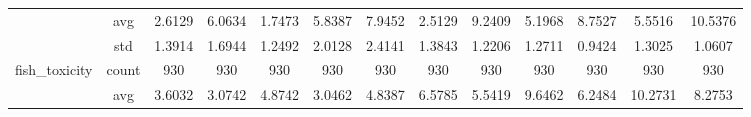 \begin{table}[htbp]
{\begin{tabular}{rcccccccccccc}
                                                     & avg                                    & 2.6129                                                                             & 6.0634                                                                    & \cellcolor[rgb]{ .776,  .937,  .808}\textcolor[rgb]{ 0,  .38,  0}{1.7473} & 5.8387                                                                    & 7.9452                                        & 2.5129                                      & 9.2409                                         & 5.1968                                         & 8.7527                                         & 5.5516                                         & 10.5376                                        \\
                                                     & std                                    & 1.3914                                                                             & 1.6944                                                                    & 1.2492                                                                    & 2.0128                                                                    & 2.4141                                        & 1.3843                                      & 1.2206                                         & 1.2711                                         & 0.9424                                         & 1.3025                                         & 1.0607                                         \\
                  fish\_toxicity                     & count                                  & 930                                                                                & 930                                                                       & 930                                                                       & 930                                                                       & 930                                           & 930                                         & 930                                            & 930                                            & 930                                            & 930                                            & 930                                            \\
                                                     & avg                                    & 3.6032                                                                             & 3.0742                                                                    & 4.8742                                                                    & \cellcolor[rgb]{ .776,  .937,  .808}\textcolor[rgb]{ 0,  .38,  0}{3.0462} & 4.8387                                        & 6.5785                                      & 5.5419                                         & 9.6462                                         & 6.2484                                         & 10.2731                                        & 8.2753                                         \\

\end{tabular}}
\end{table}

